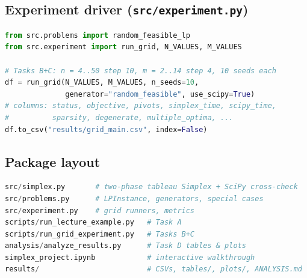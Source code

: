 \documentclass[10pt]{article}
\begin{document}
\subsection{Experiment driver (\texttt{src/experiment.py})}
\begin{lstlisting}[language=Python]
from src.problems import random_feasible_lp
from src.experiment import run_grid, N_VALUES, M_VALUES

# Tasks B+C: n = 4..50 step 10, m = 2..14 step 4, 10 seeds each
df = run_grid(N_VALUES, M_VALUES, n_seeds=10,
              generator="random_feasible", use_scipy=True)
# columns: status, objective, pivots, simplex_time, scipy_time,
#          sparsity, degenerate, multiple_optima, ...
df.to_csv("results/grid_main.csv", index=False)
\end{lstlisting}

\subsection{Package layout}
\begin{lstlisting}[language=Python]
src/simplex.py       # two-phase tableau Simplex + SciPy cross-check
src/problems.py      # LPInstance, generators, special cases
src/experiment.py    # grid runners, metrics
scripts/run_lecture_example.py   # Task A
scripts/run_grid_experiment.py   # Tasks B+C
analysis/analyze_results.py      # Task D tables & plots
simplex_project.ipynb            # interactive walkthrough
results/                         # CSVs, tables/, plots/, ANALYSIS.md
\end{lstlisting}
\end{document}

